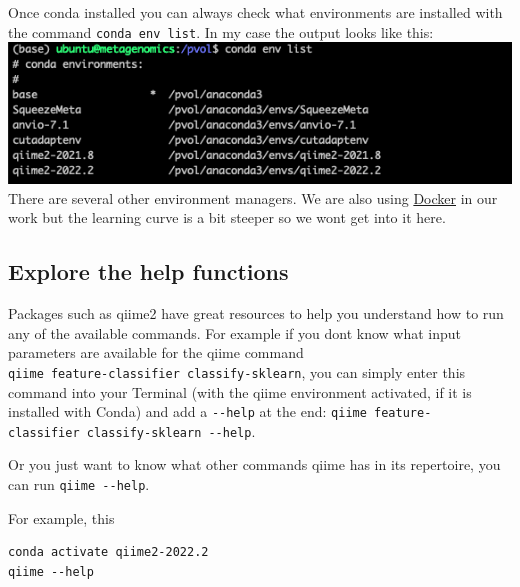 \documentclass[
]{book}
\begin{document}
Once conda installed you can always check what environments are installed with the command \texttt{conda\ env\ list}. In my case the output looks like this:\\
\includegraphics{./img/condaenvs.png}\\

There are several other environment managers. We are also using \href{https://www.docker.com/}{Docker} in our work but the learning curve is a bit steeper so we wont get into it here.

\hypertarget{explore-the-help-functions}{%
\subsection{Explore the help functions}\label{explore-the-help-functions}}

Packages such as qiime2 have great resources to help you understand how to run any of the available commands. For example if you dont know what input parameters are available for the qiime command\\
\texttt{qiime\ feature-classifier\ classify-sklearn}, you can simply enter this command into your Terminal (with the qiime environment activated, if it is installed with Conda) and add a \texttt{-\/-help} at the end: \texttt{qiime\ feature-classifier\ classify-sklearn\ -\/-help}.

Or you just want to know what other commands qiime has in its repertoire, you can run \texttt{qiime\ -\/-help}.

For example, this

\begin{verbatim}
conda activate qiime2-2022.2  
qiime --help  
\end{verbatim}
\end{document}
